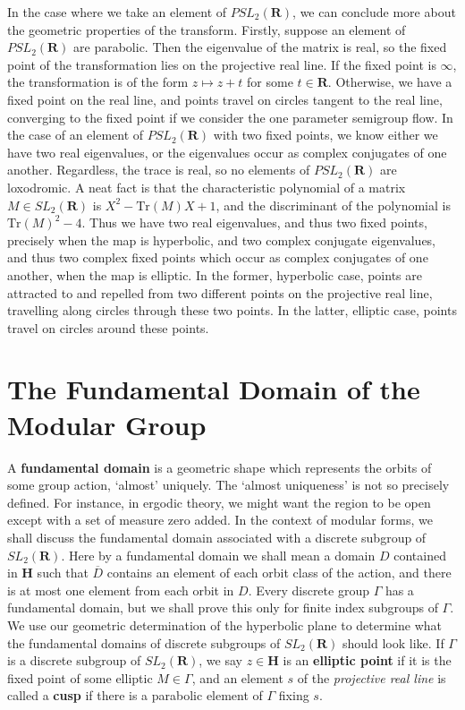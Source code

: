 In the case where we take an element of $PSL_2(\mathbf{R})$, we can conclude more about the geometric properties of the transform. Firstly, suppose an element of $PSL_2(\mathbf{R})$ are parabolic. Then the eigenvalue of the matrix is real, so the fixed point of the transformation lies on the projective real line. If the fixed point is $\infty$, the transformation is of the form $z \mapsto z + t$ for some $t \in \mathbf{R}$. Otherwise, we have a fixed point on the real line, and points travel on circles tangent to the real line, converging to the fixed point if we consider the one parameter semigroup flow. In the case of an element of $PSL_2(\mathbf{R})$ with two fixed points, we know either we have two real eigenvalues, or the eigenvalues occur as complex conjugates of one another. Regardless, the trace is real, so no elements of $PSL_2(\mathbf{R})$ are loxodromic. A neat fact is that the characteristic polynomial of a matrix $M \in SL_2(\mathbf{R})$ is $X^2 - \text{Tr}(M) X + 1$, and the discriminant of the polynomial is $\text{Tr}(M)^2 - 4$. Thus we have two real eigenvalues, and thus two fixed points, precisely when the map is hyperbolic, and two complex conjugate eigenvalues, and thus two complex fixed points which occur as complex conjugates of one another, when the map is elliptic. In the former, hyperbolic case, points are attracted to and repelled from two different points on the projective real line, travelling along circles through these two points. In the latter, elliptic case, points travel on circles around these points.

\section{The Fundamental Domain of the Modular Group}

A {\bf fundamental domain} is a geometric shape which represents the orbits of some group action, `almost' uniquely. The `almost uniqueness' is not so precisely defined. For instance, in ergodic theory, we might want the region to be open except with a set of measure zero added. In the context of modular forms, we shall discuss the fundamental domain associated with a discrete subgroup of $SL_2(\mathbf{R})$. Here by a fundamental domain we shall mean a domain $D$ contained in $\mathbf{H}$ such that $\overline{D}$ contains an element of each orbit class of the action, and there is at most one element from each orbit in $D$. Every discrete group $\Gamma$ has a fundamental domain, but we shall prove this only for finite index subgroups of $\Gamma$. We use our geometric determination of the hyperbolic plane to determine what the fundamental domains of discrete subgroups of $SL_2(\mathbf{R})$ should look like. If $\Gamma$ is a discrete subgroup of $SL_2(\mathbf{R})$, we say $z \in \mathbf{H}$ is an {\bf elliptic point} if it is the fixed point of some elliptic $M \in \Gamma$, and an element $s$ of the {\it projective real line} is called a {\bf cusp} if there is a parabolic element of $\Gamma$ fixing $s$.

